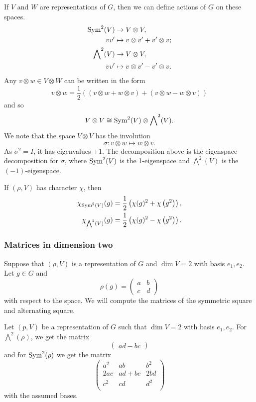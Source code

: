If $V$ and $W$ are representations of $G$, then we can define actions of $G$ on these spaces.
\begin{align*}
    \operatorname{Sym}^2(V) &\to V \otimes V, \\
    vv' &\mapsto v \otimes v' + v' \otimes v; \\
    {\bigwedge}^2(V) &\to V \otimes V, \\
    vv' &\mapsto v \otimes v' - v' \otimes v.
\end{align*}
Any $v \otimes w \in V \otimes W$ can be written in the form
\[ v \otimes w = \frac12((v \otimes w + w \otimes v) + (v \otimes w - w \otimes v)) \]
and so
\[ V \otimes V \cong \operatorname{Sym}^2(V) \otimes {\bigwedge}^2(V). \]
We note that the space $V \otimes V$ has the involution
\[\sigma: v \otimes w \mapsto w \otimes v.\]
As $\sigma^2 = I$, it has eigenvalues $\pm1$. The decomposition above is the eigenspace decomposition for $\sigma$, where $\operatorname{Sym}^2(V)$ is the 1-eigenspace and ${\bigwedge}^2(V)$ is the $(-1)$-eigenspace. 

\begin{proposition}
    If $(\rho, V)$ has character $\chi$, then
    \begin{align*}
        \chi_{\operatorname{Sym}^2(V)}(g) &= \frac12\left(\chi(g)^2 + \chi\left(g^2\right)\right), \\
        \chi_{{\bigwedge}^2(V)}(g) &= \frac12\left(\chi(g)^2 - \chi\left(g^2\right)\right). \\
    \end{align*}
\end{proposition}

\subsubsection{Matrices in dimension two}

Suppose that $(\rho, V)$ is a representation of $G$ and $\dim V = 2$ with basis $e_1, e_2$. Let $g \in G$ and
\[ 
    \rho(g) = 
    \begin{pmatrix}
        a & b \\ c & d
    \end{pmatrix}
\]
with respect to the space. We will compute the matrices of the symmetric square and alternating square. 

\begin{example}
    Let $(p, V)$ be a representation of $G$ such that $\dim V = 2$ with basis $e_1, e_2$. For ${\bigwedge}^2(\rho)$, we get the matrix
    \[ \begin{pmatrix}
        ad - bc
    \end{pmatrix} \]
    and for $\operatorname{Sym}^2(\rho)$ we get the matrix 
    \[
        \begin{pmatrix}
            a^2 & ab & b^2 \\
            2ac & ad + bc & 2bd \\
            c^2 & cd & d^2 \\
        \end{pmatrix}    
    \]
    with the assumed bases.
\end{example}

